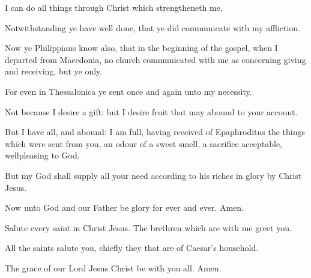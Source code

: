\Verse I can do all things through Christ which strengtheneth me.

\Verse Notwithstanding ye have well done, that ye did communicate with my affliction.

\Verse Now ye Philippians know also, that in the beginning of the gospel, when I departed from Macedonia, no church communicated with me as concerning giving and receiving, but ye only.

\Verse For even in Thessalonica ye sent once and again unto my necessity.

\Verse Not because I desire a gift: but I desire fruit that may abound to your account.

\Verse But I have all, and abound: I am full, having received of Epaphroditus the things which were sent from you, an odour of a sweet smell, a sacrifice acceptable, wellpleasing to God.

\Verse But my God shall supply all your need according to his riches in glory by Christ Jesus.

\Verse Now unto God and our Father be glory for ever and ever. Amen.

\Verse Salute every saint in Christ Jesus. The brethren which are with me greet you.

\Verse All the saints salute you, chiefly they that are of Caesar's household.

\Verse The grace of our Lord Jesus Christ be with you all. Amen.

